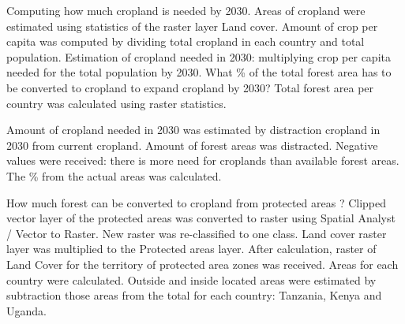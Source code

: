 \documentclass[portrait,final,a0paper,fontscale=0.277]{baposter}
\begin{document}
\begin{poster}
{\begin{multicols}{2}
      \scriptsize{   
Computing how much cropland is needed by 2030. Areas of cropland were estimated using statistics of the raster layer Land cover. Amount of crop per capita was computed by dividing total cropland in each country and total population. Estimation of cropland needed in 2030: multiplying crop per capita needed for the total population by 2030. What \% of the total forest area has to be converted to cropland to expand cropland by 2030? Total forest area per country was calculated using raster statistics.}

	\tiny{
Amount of cropland needed in 2030 was estimated by distraction cropland in 2030 from current cropland. Amount of forest areas was distracted. Negative values were received: there is more need for croplands than available forest areas. The \%  from the actual areas was calculated.

How much forest can be converted to cropland from protected areas ? Clipped vector layer of the protected areas was converted to raster using Spatial Analyst / Vector to Raster. New raster was re-classified to one class. Land cover raster layer was multiplied to the Protected areas layer. After calculation, raster of Land Cover for the territory of protected area zones was received. Areas for each country were calculated. Outside and inside located areas were estimated by subtraction those areas from the total for each country: Tanzania, Kenya and Uganda.
	}
       \end{multicols}
}

\end{poster}
\end{document}

